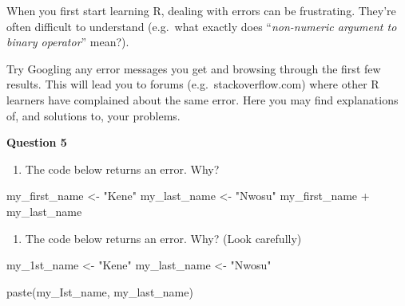 \documentclass[
  letterpaper,
  DIV=11,
  numbers=noendperiod]{scrreprt}
\newenvironment{Shaded}{\begin{snugshade}}{\end{snugshade}}
\newcommand{\FunctionTok}[1]{\textcolor[rgb]{0.28,0.35,0.67}{#1}}
\newcommand{\NormalTok}[1]{\textcolor[rgb]{0.00,0.23,0.31}{#1}}
\newcommand{\OtherTok}[1]{\textcolor[rgb]{0.00,0.23,0.31}{#1}}
\newcommand{\SpecialCharTok}[1]{\textcolor[rgb]{0.37,0.37,0.37}{#1}}
\newcommand{\StringTok}[1]{\textcolor[rgb]{0.13,0.47,0.30}{#1}}
\providecommand{\tightlist}{%
  \setlength{\itemsep}{0pt}\setlength{\parskip}{0pt}}\usepackage{longtable,booktabs,array}
\begin{document}
When you first start learning R, dealing with errors can be frustrating.
They're often difficult to understand (e.g.~what exactly does
``\emph{non-numeric argument to binary operator}'' mean?).

Try Googling any error messages you get and browsing through the first
few results. This will lead you to forums (e.g.~stackoverflow.com) where
other R learners have complained about the same error. Here you may find
explanations of, and solutions to, your problems.

\begin{tcolorbox}[enhanced jigsaw, title=\textcolor{quarto-callout-tip-color}{\faLightbulb}\hspace{0.5em}{Practice}, colbacktitle=quarto-callout-tip-color!10!white, leftrule=.75mm, arc=.35mm, opacityback=0, bottomrule=.15mm, rightrule=.15mm, toptitle=1mm, breakable, toprule=.15mm, colback=white, coltitle=black, colframe=quarto-callout-tip-color-frame, bottomtitle=1mm, titlerule=0mm, left=2mm, opacitybacktitle=0.6]

\textbf{Question 5}

\begin{enumerate}
\def\labelenumi{\alph{enumi}.}
\tightlist
\item
  The code below returns an error. Why?
\end{enumerate}

\begin{Shaded}
\begin{Highlighting}[]
\NormalTok{my\_first\_name }\OtherTok{\textless{}{-}} \StringTok{"Kene"}
\NormalTok{my\_last\_name }\OtherTok{\textless{}{-}} \StringTok{"Nwosu"}
\NormalTok{my\_first\_name }\SpecialCharTok{+}\NormalTok{ my\_last\_name}
\end{Highlighting}
\end{Shaded}

\begin{enumerate}
\def\labelenumi{\alph{enumi}.}
\setcounter{enumi}{1}
\tightlist
\item
  The code below returns an error. Why? (Look carefully)
\end{enumerate}

\begin{Shaded}
\begin{Highlighting}[]
\NormalTok{my\_1st\_name }\OtherTok{\textless{}{-}} \StringTok{"Kene"}
\NormalTok{my\_last\_name }\OtherTok{\textless{}{-}} \StringTok{"Nwosu"}

\FunctionTok{paste}\NormalTok{(my\_Ist\_name, my\_last\_name)}
\end{Highlighting}
\end{Shaded}

\end{tcolorbox}
\end{document}
